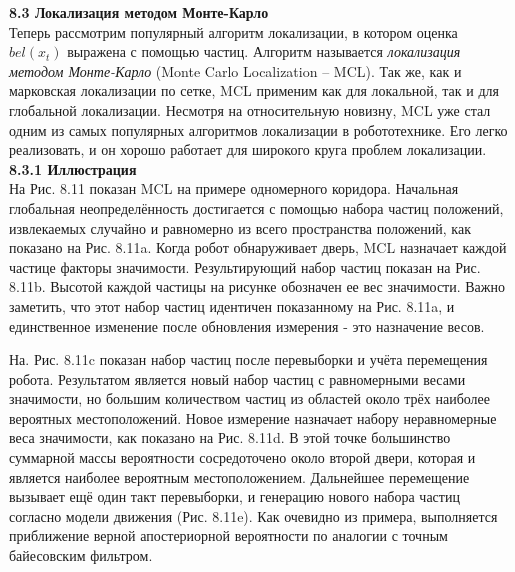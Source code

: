 \documentclass[10pt,a4paper]{article}
\begin{document}
\textbf{8.3	Локализация методом Монте-Карло}\\

Теперь рассмотрим популярный алгоритм локализации, в котором  оценка $bel(x_t)$ выражена с помощью частиц. Алгоритм называется \textit{локализация методом Монте-Карло} (Monte Carlo Localization – MCL). Так же, как и марковская локализации по сетке, MCL применим как для локальной, так и для глобальной локализации. Несмотря на относительную новизну, MCL уже стал одним из самых популярных алгоритмов локализации в робототехнике. Его легко реализовать, и он хорошо работает для широкого круга проблем локализации. \\

\textbf{8.3.1	Иллюстрация}\\

На Рис. 8.11 показан MCL на примере одномерного коридора. Начальная глобальная неопределённость достигается с помощью набора частиц положений, извлекаемых случайно и равномерно из всего пространства положений, как показано на Рис. 8.11a. Когда робот обнаруживает дверь, MCL назначает каждой частице факторы значимости. Результирующий набор частиц показан на Рис. 8.11b. Высотой каждой частицы на рисунке обозначен ее вес значимости. Важно заметить, что этот набор частиц идентичен показанному на Рис. 8.11a, и единственное изменение после обновления измерения - это назначение весов. 

На. Рис. 8.11c показан набор частиц после перевыборки и учёта перемещения робота. Результатом является новый набор частиц с равномерными весами значимости, но большим количеством частиц из областей около трёх наиболее вероятных местоположений. Новое измерение назначает набору неравномерные веса значимости, как показано на Рис. 8.11d. В этой точке большинство суммарной массы вероятности сосредоточено около второй двери, которая и является наиболее вероятным местоположением. Дальнейшее перемещение вызывает ещё один такт перевыборки, и генерацию нового набора частиц согласно модели движения (Рис. 8.11e). Как очевидно из примера, выполняется приближение верной апостериорной вероятности по аналогии с точным байесовским фильтром.
\end{document}
